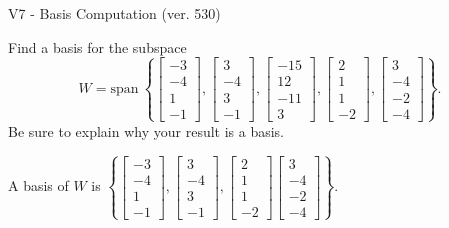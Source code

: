 \begin{exercise}
  \begin{exerciseTitle}V7 - Basis Computation (ver. 530)\end{exerciseTitle}
  \begin{exerciseStatement}
    Find a basis for the subspace 
\[W=\mathrm{span}\ \left\{\left[\begin{array}{r}
-3 \\
-4 \\
1 \\
-1
\end{array}\right] , \left[\begin{array}{r}
3 \\
-4 \\
3 \\
-1
\end{array}\right] , \left[\begin{array}{r}
-15 \\
12 \\
-11 \\
3
\end{array}\right] , \left[\begin{array}{r}
2 \\
1 \\
1 \\
-2
\end{array}\right] , \left[\begin{array}{r}
3 \\
-4 \\
-2 \\
-4
\end{array}\right]\right\}.\]
 Be sure to explain why your result is a basis.


  \end{exerciseStatement}
  \begin{exerciseAnswer}
   A basis of \(W\) is  \(\left\{\left[\begin{array}{r}
-3 \\
-4 \\
1 \\
-1
\end{array}\right] , \left[\begin{array}{r}
3 \\
-4 \\
3 \\
-1
\end{array}\right] , \left[\begin{array}{r}
2 \\
1 \\
1 \\
-2
\end{array}\right] \left[\begin{array}{r}
3 \\
-4 \\
-2 \\
-4
\end{array}\right]\right\}\).
  


  \end{exerciseAnswer}
\end{exercise}